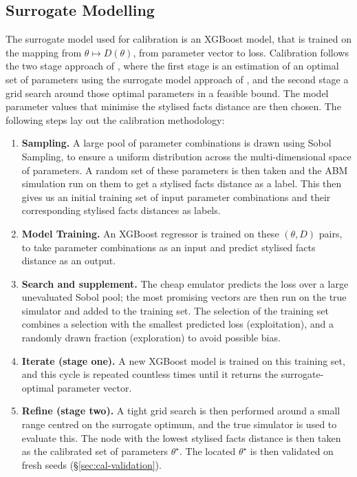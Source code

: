 \subsection{Surrogate Modelling}

The surrogate model used for calibration is an XGBoost model, that is trained on the mapping from $\theta\mapsto D(\theta)$, from parameter vector to loss. Calibration follows the two stage approach of \cite{gao_2022_hfabm}, where the first stage is an estimation of an optimal set of parameters using the surrogate model approach of \cite{gao_2022_xgb}, and the second stage a grid search around those optimal parameters in a feasible bound. The model parameter values that minimise the stylised facts distance are then chosen. The following steps lay out the calibration methodology:
\begin{enumerate}
\item \textbf{Sampling.} A large pool of parameter combinations is drawn using Sobol Sampling, to ensure a uniform distribution across the multi-dimensional space of parameters. A random set of these parameters is then taken and the ABM simulation run on them to get a stylised facts distance as a label. This then gives us an initial training set of input parameter combinations and their corresponding stylised facts distances as labels.
\item \textbf{Model Training.} An XGBoost regressor is trained on these $(\theta, D)$ pairs, to take parameter combinations as an input and predict stylised facts distance as an output.
\item \textbf{Search and supplement.} The cheap emulator predicts the loss over a large unevaluated
Sobol pool; the most promising vectors are then run on the true simulator and added to the training
set. The selection of the training set combines a selection with the smallest predicted loss (exploitation), and a randomly drawn fraction (exploration) to avoid possible bias. 
\item \textbf{Iterate (stage one).} A new XGBoost model is trained on this training set, and this cycle is repeated countless times until it returns the surrogate-optimal parameter vector.
\item \textbf{Refine (stage two).} A tight grid search is then performed around a small range centred on the surrogate optimum, and the true simulator is used to evaluate this. The node with the lowest stylised facts distance is then taken as the calibrated set of parameters  $\theta^\star$. The located $\theta^\star$ is then validated on fresh seeds (\S\ref{sec:cal-validation}).
\end{enumerate}

